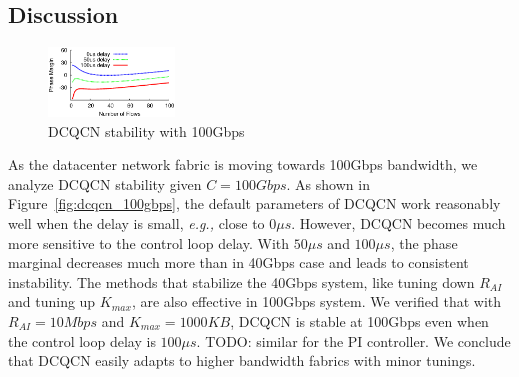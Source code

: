 \subsection{Discussion}

\begin{figure}[t]
\center
\includegraphics[width=0.3\textwidth]{figures/dcqcn_stability_100gbps.eps}
\caption{DCQCN stability with 100Gbps}
\end{figure}


  As the datacenter network fabric is moving towards 100Gbps bandwidth, we analyze
DCQCN stability given $C=100Gbps$. As shown in Figure~\ref{fig:dcqcn_100gbps}, the default parameters of DCQCN work 
reasonably well when the delay is small, {\em e.g.,} close to $0\mu s$.
However, DCQCN becomes much more sensitive to the control loop delay. With $50\mu s$ and $100\mu s$, the phase marginal
decreases much more than in 40Gbps case and leads to consistent instability.
The methods that stabilize the 40Gbps system, like tuning down $R_{AI}$ and tuning up $K_{max}$, are also effective
in 100Gbps system. We verified that with $R_{AI}=10Mbps$ and $K_{max}=1000KB$, DCQCN is stable at 100Gbps even when
the control loop delay is $100\mu s$. TODO: similar for the PI controller. We conclude that DCQCN easily adapts to 
higher bandwidth fabrics with minor tunings. 